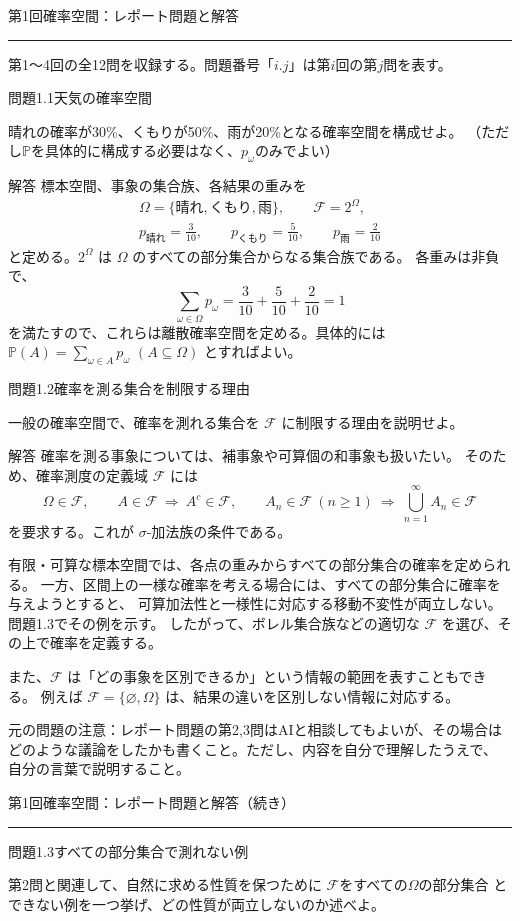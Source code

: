 \documentclass[a4paper,10pt,pdflatex,ja=standard,jafont=ipaex-type1,
  magstyle=real,scale=1]{bxjsarticle}
\newcommand{\topic}[1]{\par\vspace{5pt}
  {\large\sffamily\mdseries\color{accent}#1}\par\vspace{2pt}}
\newcommand{\handouttitle}[1]{%
  \begin{center}
    {\Large\sffamily\mdseries\color{ink}#1}\par\vspace{3mm}
    {\color{accent}\rule{0.88\linewidth}{0.7pt}}
  \end{center}\vspace{-2mm}}
\newcommand{\keybox}[1]{\par\vspace{3pt}\begingroup
  \setlength{\fboxsep}{5pt}
  \colorbox{soft}{\parbox{\dimexpr\linewidth-2\fboxsep\relax}{#1}}%
  \endgroup\par\vspace{2pt}}
\newcommand{\examplelabel}[1]{{\sffamily\mdseries\color{ink}#1}}
\newcommand{\F}{\mathcal F}
\newcommand{\Prob}{\mathbb P}
\begin{document}
\fontsize{10pt}{13.5pt}\selectfont
\handouttitle{第1回\quad 確率空間：レポート問題と解答}
{\small\color{muted}第1〜4回の全12問を収録する。問題番号「$i.j$」は第$i$回の第$j$問を表す。}

\topic{問題1.1\quad 天気の確率空間}
\keybox{晴れの確率が30\%、くもりが50\%、雨が20\%となる確率空間を構成せよ。
（ただし$\mathbb P$を具体的に構成する必要はなく、$p_{\omega}$のみでよい）}

\examplelabel{解答}
標本空間、事象の集合族、各結果の重みを
$$
  \begin{gathered}
    \Omega=\{\text{晴れ},\text{くもり},\text{雨}\},\qquad \F=2^\Omega,\\
    p_{\text{晴れ}}=\frac3{10},\qquad
    p_{\text{くもり}}=\frac5{10},\qquad
    p_{\text{雨}}=\frac2{10}
  \end{gathered}
$$
と定める。$2^\Omega$ は $\Omega$ のすべての部分集合からなる集合族である。
各重みは非負で、
$$
  \sum_{\omega\in\Omega}p_\omega=\frac3{10}+\frac5{10}+\frac2{10}=1
$$
を満たすので、これらは離散確率空間を定める。具体的には
$\Prob(A)=\sum_{\omega\in A}p_\omega$ $(A\subseteq\Omega)$ とすればよい。

\topic{問題1.2\quad 確率を測る集合を制限する理由}
\keybox{一般の確率空間で、確率を測れる集合を $\F$ に制限する理由を説明せよ。}

\examplelabel{解答}
確率を測る事象については、補事象や可算個の和事象も扱いたい。
そのため、確率測度の定義域 $\F$ には
$$
  \Omega\in\F,\qquad
  A\in\F\ \Longrightarrow\ A^c\in\F,\qquad
  A_n\in\F\ (n\ge1)\ \Longrightarrow\ \bigcup_{n=1}^{\infty}A_n\in\F
$$
を要求する。これが $\sigma$-加法族の条件である。

有限・可算な標本空間では、各点の重みからすべての部分集合の確率を定められる。
一方、区間上の一様な確率を考える場合には、すべての部分集合に確率を与えようとすると、
可算加法性と一様性に対応する移動不変性が両立しない。問題1.3でその例を示す。
したがって、ボレル集合族などの適切な $\F$ を選び、その上で確率を定義する。

また、$\F$ は「どの事象を区別できるか」という情報の範囲を表すこともできる。
例えば $\F=\{\varnothing,\Omega\}$ は、結果の違いを区別しない情報に対応する。

\keybox{元の問題の注意：レポート問題の第2,3問はAIと相談してもよいが、その場合は
どのような議論をしたかも書くこと。ただし、内容を自分で理解したうえで、
自分の言葉で説明すること。}

\clearpage
\handouttitle{第1回\quad 確率空間：レポート問題と解答（続き）}

\topic{問題1.3\quad すべての部分集合で測れない例}
\keybox{第2問と関連して、自然に求める性質を保つために $\F$をすべての$\Omega$の部分集合
とできない例を一つ挙げ、どの性質が両立しないのか述べよ。}
\end{document}
